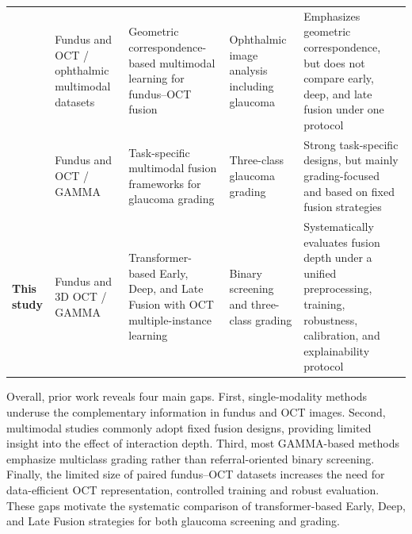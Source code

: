 \documentclass{ieeeaccess}
\begin{document}
\begin{table}[!t]
{\begin{tabular}{p{} p{} p{} p{} p{}}
            \cite{wang2024geometric}                                                                    &
            Fundus and OCT / ophthalmic multimodal datasets                                             &
            Geometric correspondence-based multimodal learning for fundus--OCT fusion                   &
            Ophthalmic image analysis including glaucoma                                                &
            Emphasizes geometric correspondence, but does not compare early, deep, and late fusion under one protocol                           \\

            \cite{cai2022corolla,zhao2025enhancing}                                                     &
            Fundus and OCT / GAMMA                                                                      &
            Task-specific multimodal fusion frameworks for glaucoma grading                             &
            Three-class glaucoma grading                                                                &
            Strong task-specific designs, but mainly grading-focused and based on fixed fusion strategies                                       \\

            \textbf{This study}                                                                         &
            Fundus and 3D OCT / GAMMA                                                                   &
            Transformer-based Early, Deep, and Late Fusion with OCT multiple-instance learning          &
            Binary screening and three-class grading                                                    &
            Systematically evaluates fusion depth under a unified preprocessing, training, robustness, calibration, and explainability protocol \\
            \hline
        \end{tabular}
    }
\end{table}

Overall, prior work reveals four main gaps. First, single-modality methods underuse the complementary information in fundus and OCT images. Second, multimodal studies commonly adopt fixed fusion designs, providing limited insight into the effect of interaction depth. Third, most GAMMA-based methods emphasize multiclass grading rather than referral-oriented binary screening. Finally, the limited size of paired fundus--OCT datasets increases the need for data-efficient OCT representation, controlled training and robust evaluation. These gaps motivate the systematic comparison of transformer-based Early, Deep, and Late Fusion strategies for both glaucoma screening and grading.
\end{document}
